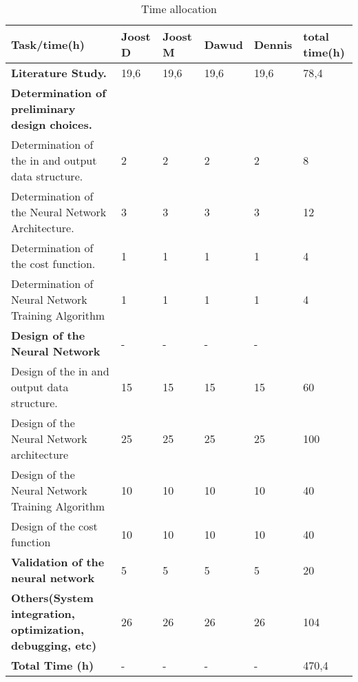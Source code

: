 \begin{sidewaystable}[h!]
	\centering
	\caption{Time allocation}
	\label{tab:timeallocation}
	\begin{tabular}{|l|llll|l|} \hline
		Task/time(h)                                               & Joost D & Joost M & Dawud & Dennis & total time(h) \\ \hline
		\textbf{Literature Study.}                                           & 19,6    & 19,6    & 19,6  & 19,6   & 78,4          \\
		\textbf{Determination of preliminary design choices.}               &         &         &       &        &               \\
		Determination of the in and output data structure.         & 2       & 2       & 2     & 2      & 8             \\
		Determination of the Neural Network Architecture.          & 3       & 3       & 3     & 3      & 12            \\
		Determination of the cost function.                        & 1       & 1       & 1     & 1      & 4             \\
		Determination of Neural Network Training Algorithm         & 1       & 1       & 1     & 1      & 4             \\
		\textbf{Design of the Neural Network}                      &     -    &  -       &    -   & - 		    &               \\
		Design of the in and output data structure.                & 15      & 15      & 15    & 15     & 60            \\
		Design of the Neural Network architecture                  & 25      & 25      & 25    & 25     & 100           \\
		Design of the Neural Network Training Algorithm            & 10      & 10      & 10    & 10     & 40            \\
		Design of the cost function                                & 10      & 10      & 10    & 10     & 40            \\
		\textbf{Validation of the neural network}                  & 5       & 5       & 5     & 5      & 20            \\
		\textbf{Others(System integration, optimization, debugging, etc)} & 26      & 26      & 26    & 26     & 104           \\
		\textbf{Total Time (h)}                                              &   -      &    -     &   -    &   -     & 470,4       \\ \hline
	\end{tabular}
\end{sidewaystable}

